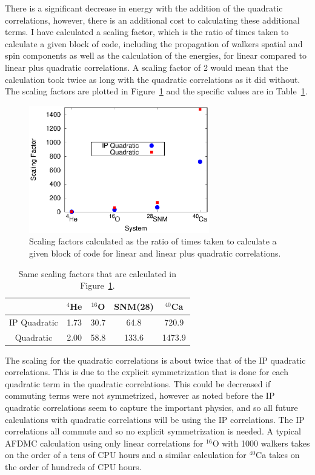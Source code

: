 There is a significant decrease in energy with the addition of the quadratic correlations, however, there is an additional cost to calculating these additional terms. I have calculated a scaling factor, which is the ratio of times taken to calculate a given block of code, including the propagation of walkers spatial and spin components as well as the calculation of the energies, for linear compared to linear plus quadratic correlations. A scaling factor of 2 would mean that the calculation took twice as long with the quadratic correlations as it did without. The scaling factors are plotted in Figure~\ref{fig:scaling} and the specific values are in Table~\ref{tab:scaling}.
\begin{figure}[h!]
   \centering
   \includegraphics[width=0.7\textwidth]{figures/scaling.eps}
   \caption{Scaling factors calculated as the ratio of times taken to calculate a given block of code for linear and linear plus quadratic correlations.}
   \label{fig:scaling}
\end{figure}
\begin{table}[htb]
   \centering
   \begin{tabular}{ccccc}
      \hline \hline
       & $^{4}$He & $^{16}$O & SNM(28) & $^{40}$Ca \\
      \hline
      IP Quadratic & 1.73 & 30.7 & 64.8 & 720.9 \\
      Quadratic & 2.00 & 58.8 & 133.6 & 1473.9 \\
      \hline \hline
   \end{tabular}
   \caption{Same scaling factors that are calculated in Figure~\ref{fig:scaling}.}
   \label{tab:scaling}
\end{table}
The scaling for the quadratic correlations is about twice that of the IP quadratic correlations. This is due to the explicit symmetrization that is done for each quadratic term in the quadratic correlations. This could be decreased if commuting terms were not symmetrized, however as noted before the IP quadratic correlations seem to capture the important physics, and so all future calculations with quadratic correlations will be using the IP correlations. The IP correlations all commute and so no explicit symmetrization is needed. A typical AFDMC calculation using only linear correlations for $^{16}$O with 1000 walkers takes on the order of a tens of CPU hours and a similar calculation for $^{40}$Ca takes on the order of hundreds of CPU hours.

